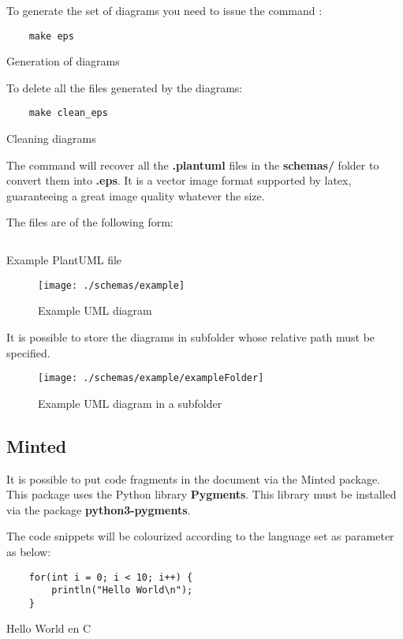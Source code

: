 To generate the set of diagrams you need to issue the command :
\begin{code}
    \begin{verbatim}
    make eps
\end{verbatim}
    \caption{Generation of diagrams}
\end{code}

To delete all the files generated by the diagrams:
\begin{code}
    \begin{verbatim}
    make clean_eps
\end{verbatim}
    \caption{Cleaning diagrams}
\end{code}

The command will recover all the \textbf{.plantuml} files
in the \textbf{schemas/} folder to convert them into \textbf{.eps}.
It is a vector image format supported by \gls{latex},
guaranteeing a great image quality whatever the size.

The files are of the following form:
\begin{code}
    \inputminted{vim}{schemas/example.plantuml}
    \caption{Example PlantUML file}
\end{code}

\begin{figure}[H]
    \centering
    \texttt{[image: ./schemas/example]}
    \caption{Example UML diagram}
\end{figure}

It is possible to store the diagrams in subfolder whose relative path must be specified.
\begin{figure}[H]
    \centering
    \texttt{[image: ./schemas/example/exampleFolder]}
    \caption{Example UML diagram in a subfolder}
\end{figure}

\subsection{Minted}
It is possible to put code fragments in the document via the Minted package.
This package uses the Python library \textbf{Pygments}.
This library must be installed via the package \textbf{python3-pygments}.

The code snippets will be colourized according to the language set as parameter as below:

\begin{code}
    \begin{verbatim}
    for(int i = 0; i < 10; i++) {
        println("Hello World\n");
    }
\end{verbatim}
    \caption{Hello World en C}
\end{code}

